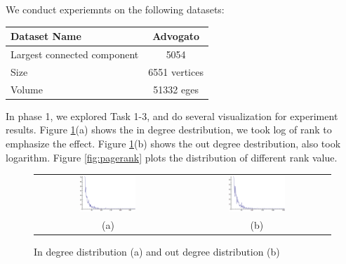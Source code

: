 We conduct experiemnts on the following datasets:

\begin{center}
\begin{tabular}{| l | c |}
  \hline                        
  Dataset Name & Advogato  \\ \hline
  Largest connected component & 5054  \\ \hline
  Size & 6551 vertices  \\ \hline
  Volume & 51332 eges \\ \hline
\end{tabular}
\end{center}

In phase 1, we explored Task 1-3, and do several visualization for experiment results. Figure \ref{fig:results}(a) shows the in degree destribution, we took log of rank to emphasize the effect. Figure \ref{fig:results}(b) shows the out degree destribution, also took logarithm. Figure \ref{fig:pagerank} plots the distribution of different rank value.

\begin{figure}[htbf]
\begin{center}
\begin{tabular}{cc}
     \includegraphics[width=0.4\textwidth]{FIG/indegree.png} &
     \includegraphics[width=0.4\textwidth]{FIG/outdegree.png} \\
    (a) & (b) 
\end{tabular}
\caption{In degree distribution (a) and out degree distribution (b)}
\label{fig:results}
\end{center}
\end{figure}

